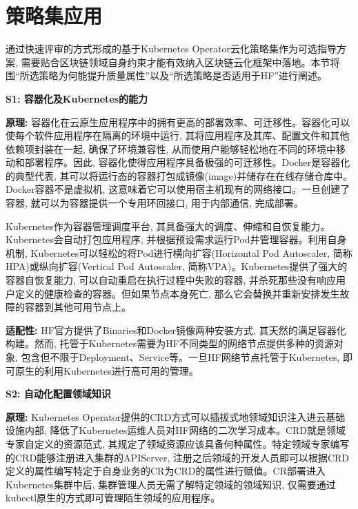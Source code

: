 \section{策略集应用}\label{section: policy_set_application}

通过快速评审的方式形成的基于Kubernetes Operator云化策略集作为可选指导方案, 需要贴合区块链领域自身约束才能有效纳入区块链云化框架中落地。本节将围“所选策略为何能提升质量属性”以及“所选策略是否适用于HF”进行阐述。

\textbf{S1: 容器化及Kubernetes的能力}

\textbf{原理: }容器化在云原生应用程序中的拥有更高的部署效率\cite{zhou2021container}、可迁移性。容器化可以使每个软件应用程序在隔离的环境中运行, 其将应用程序及其库、配置文件和其他依赖项封装在一起, 确保了环境兼容性, 从而使用户能够轻松地在不同的环境中移动和部署程序。因此, 容器化使得应用程序具备极强的可迁移性。Docker\footnotemark[1]是容器化的典型代表, 其可以将运行态的容器打包成镜像(image)并储存在在线存储仓库中。Docker容器不是虚拟机, 这意味着它可以使用宿主机现有的网络接口\cite{shah2019building}。一旦创建了容器, 就可以为容器提供一个专用环回接口, 用于内部通信, 完成部署。

Kubernetes作为容器管理调度平台, 其具备强大的调度、伸缩和自恢复能力。Kubernetes会自动打包应用程序, 并根据预设需求运行Pod并管理容器。利用自身机制, Kubernetes可以轻松的将Pod进行横向扩容(Horizontal Pod Autoscaler, 简称HPA)或纵向扩容(Vertical Pod Autoscaler, 简称VPA)。Kubernetes提供了强大的容器自恢复能力, 可以自动重启在执行过程中失败的容器, 并杀死那些没有响应用户定义的健康检查的容器。但如果节点本身死亡, 那么它会替换并重新安排发生故障的容器到其他可用节点上。

\textbf{适配性: }HF官方提供了Binaries和Docker镜像两种安装方式\footnotemark[2], 其天然的满足容器化构建。然而, 托管于Kubernetes需要为HF不同类型的网络节点提供多种的资源对象, 包含但不限于Deployment、Service等。一旦HF网络节点托管于Kubernetes, 即可原生的利用Kubernetes进行高可用的管理。

\textbf{S2: 自动化配置领域知识}

\textbf{原理: } Kubernetes Operator提供的CRD方式可以插拔式地领域知识注入进云基础设施内部, 降低了Kubernetes运维人员对HF网络的二次学习成本。CRD就是领域专家自定义的资源范式, 其规定了领域资源应该具备何种属性。特定领域专家编写的CRD能够注册进入集群的APIServer, 注册之后领域的开发人员即可以根据CRD定义的属性编写特定于自身业务的CR为CRD的属性进行赋值。CR部署进入Kubernetes集群中后, 集群管理人员无需了解特定领域的领域知识, 仅需要通过kubectl原生的方式即可管理陌生领域的应用程序。


